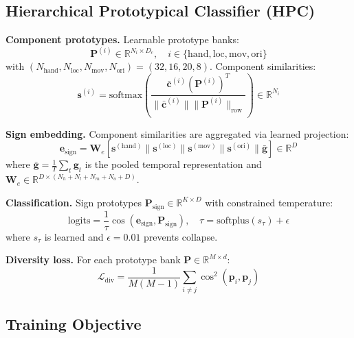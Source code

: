 \documentclass{article}
\theoremstyle{definition}
\theoremstyle{remark}
\begin{document}
\subsection{Hierarchical Prototypical Classifier (HPC)}

\textbf{Component prototypes.} Learnable prototype banks:
\begin{equation}
\mathbf{P}^{(i)} \in \mathbb{R}^{N_i \times D_c}, \quad i \in \{\text{hand}, \text{loc}, \text{mov}, \text{ori}\}
\end{equation}
with $(N_{\text{hand}}, N_{\text{loc}}, N_{\text{mov}}, N_{\text{ori}}) = (32, 16, 20, 8)$. Component similarities:
\begin{equation}
\mathbf{s}^{(i)} = \text{softmax}\left(\frac{\bar{\mathbf{c}}^{(i)} (\mathbf{P}^{(i)})^T}{\|\bar{\mathbf{c}}^{(i)}\| \|\mathbf{P}^{(i)}\|_{\text{row}}}\right) \in \mathbb{R}^{N_i}
\end{equation}

\textbf{Sign embedding.} Component similarities are aggregated via learned projection:
\begin{equation}
\mathbf{e}_{\text{sign}} = \mathbf{W}_e [\mathbf{s}^{(\text{hand})} \| \mathbf{s}^{(\text{loc})} \| \mathbf{s}^{(\text{mov})} \| \mathbf{s}^{(\text{ori})} \| \bar{\mathbf{g}}] \in \mathbb{R}^{D}
\end{equation}
where $\bar{\mathbf{g}} = \frac{1}{T}\sum_t \mathbf{g}_t$ is the pooled temporal representation and $\mathbf{W}_e \in \mathbb{R}^{D \times (N_h + N_l + N_m + N_o + D)}$.

\textbf{Classification.} Sign prototypes $\mathbf{P}_{\text{sign}} \in \mathbb{R}^{K \times D}$ with constrained temperature:
\begin{equation}
\text{logits} = \frac{1}{\tau} \cos(\mathbf{e}_{\text{sign}}, \mathbf{P}_{\text{sign}}), \quad \tau = \text{softplus}(s_\tau) + \epsilon
\end{equation}
where $s_\tau$ is learned and $\epsilon = 0.01$ prevents collapse.

\textbf{Diversity loss.} For each prototype bank $\mathbf{P} \in \mathbb{R}^{M \times d}$:
\begin{equation}
\mathcal{L}_{\text{div}} = \frac{1}{M(M-1)} \sum_{i \neq j} \cos^2(\mathbf{p}_i, \mathbf{p}_j)
\end{equation}

\subsection{Training Objective}
\end{document}
